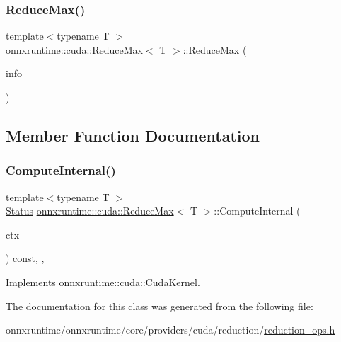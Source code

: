 \subsubsection{\texorpdfstring{Reduce\+Max()}{ReduceMax()}}
{\footnotesize\ttfamily template$<$typename T $>$ \\
\mbox{\hyperlink{classonnxruntime_1_1cuda_1_1ReduceMax}{onnxruntime\+::cuda\+::\+Reduce\+Max}}$<$ T $>$\+::\mbox{\hyperlink{classonnxruntime_1_1cuda_1_1ReduceMax}{Reduce\+Max}} (\begin{DoxyParamCaption}\item[{const \mbox{\hyperlink{classonnxruntime_1_1OpKernelInfo}{Op\+Kernel\+Info}} \&}]{info }\end{DoxyParamCaption})\hspace{0.3cm}{\ttfamily [inline]}}



\subsection{Member Function Documentation}
\mbox{\label{classonnxruntime_1_1cuda_1_1ReduceMax_ac33cd3745a6dd041abdb98b1e0fb43d4}} 
\subsubsection{\texorpdfstring{Compute\+Internal()}{ComputeInternal()}}
{\footnotesize\ttfamily template$<$typename T $>$ \\
\mbox{\hyperlink{classonnxruntime_1_1common_1_1Status}{Status}} \mbox{\hyperlink{classonnxruntime_1_1cuda_1_1ReduceMax}{onnxruntime\+::cuda\+::\+Reduce\+Max}}$<$ T $>$\+::Compute\+Internal (\begin{DoxyParamCaption}\item[{\mbox{\hyperlink{classonnxruntime_1_1OpKernelContext}{Op\+Kernel\+Context}} $\ast$}]{ctx }\end{DoxyParamCaption}) const\hspace{0.3cm}{\ttfamily [inline]}, {\ttfamily [override]}, {\ttfamily [virtual]}}



Implements \mbox{\hyperlink{classonnxruntime_1_1cuda_1_1CudaKernel_aca7af04ae448017d6023d30bba231ebb}{onnxruntime\+::cuda\+::\+Cuda\+Kernel}}.



The documentation for this class was generated from the following file\+:\begin{DoxyCompactItemize}
\item 
onnxruntime/onnxruntime/core/providers/cuda/reduction/\mbox{\hyperlink{cuda_2reduction_2reduction__ops_8h}{reduction\+\_\+ops.\+h}}\end{DoxyCompactItemize}
